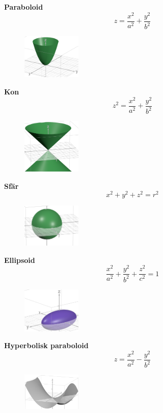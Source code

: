 \documentclass[a4paper,12pt]{article}
\begin{document}
\textbf{Paraboloid}
\[
z = \frac{x^2}{a^2} + \frac{y^2}{b^2}
\]
\begin{figure}[H]
  \centering
  \includegraphics[width=0.25\textwidth]{paraboloid.png}
\end{figure}

\textbf{Kon}
\[
z^2 = \frac{x^2}{a^2} + \frac{y^2}{b^2}
\]
\begin{figure}[H]
  \centering
  \includegraphics[width=0.25\textwidth]{kon.png}
\end{figure}

\textbf{Sfär}
\[
x^2 + y^2 + z^2 = r^2
\]
\begin{figure}[H]
  \centering
  \includegraphics[width=0.25\textwidth]{sfar.png}
\end{figure}

\textbf{Ellipsoid}
\[
\frac{x^2}{a^2} + \frac{y^2}{b^2} + \frac{z^2}{c^2} = 1
\]
\begin{figure}[H]
  \centering
  \includegraphics[width=0.25\textwidth]{ellipsoid.png}
\end{figure}

\textbf{Hyperbolisk paraboloid}
\[
z = \frac{x^2}{a^2} - \frac{y^2}{b^2}
\]
\begin{figure}[H]
  \centering
  \includegraphics[width=0.25\textwidth]{hyperboliskparaboloid.png}
\end{figure}
\end{document}

